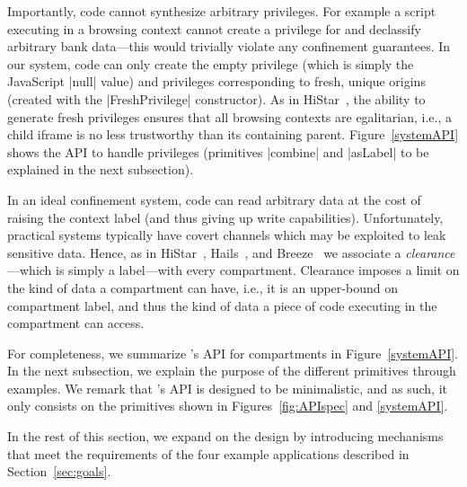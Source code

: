 Importantly, code cannot synthesize arbitrary privileges.
%
For example a script executing in a  browsing
context cannot create a privilege for  and declassify
arbitrary bank data---this would trivially violate any confinement
guarantees.
%
In our system, code can only create the empty privilege (which is
simply the JavaScript \js|null| value) and privileges corresponding
to fresh, unique origins (created with the \js|FreshPrivilege|
constructor).
%
As in HiStar~\cite{Zeldovich:2006}, the ability to generate fresh privileges
ensures that all browsing contexts are egalitarian, i.e., a child iframe is no
less trustworthy than its containing parent.  Figure~\ref{systemAPI} shows the
API to handle privileges (primitives \js|combine| and \js|asLabel| to be 
explained in the next subsection). 


In an ideal confinement system, code can read arbitrary data at the
cost of raising the context label (and thus giving up write
capabilities).
%
Unfortunately, practical systems typically have covert channels which
may be exploited to leak sensitive data.
%
Hence, as in HiStar~\cite{Zeldovich:2006}, Hails~\cite{giffin:2012:hails}, and
Breeze~\cite{Breeze13} we associate a \emph{clearance}---which is
simply a label---with every compartment.
%
Clearance imposes a limit on the kind of data a compartment can have,
i.e., it is an upper-bound on compartment label, and thus the kind of
data a piece of code executing in the compartment can access.

For completeness, we summarize  \sys{}'s API for compartments
in Figure~\ref{systemAPI}. In the next subsection, 
we explain the purpose of the different primitives through examples. 
We remark that \sys{}'s API is designed to be minimalistic, and as such, it only
consists on the primitives shown in Figures~\ref{fig:APIspec} and
\ref{systemAPI}.

In the rest of this section, we expand on the \sys{} design by
introducing mechanisms that meet the requirements of the four
example applications described in Section~\ref{sec:goals}.
%


